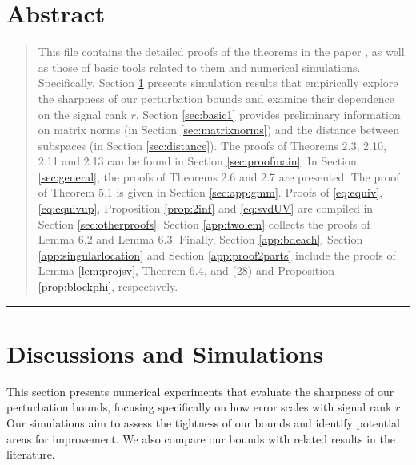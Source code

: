 \documentclass[reqno]{amsart}
\theoremstyle{plain}
\theoremstyle{definition}
\begin{document}
\section*{Abstract}
\begin{quotation}
\noindent This file contains the detailed proofs of the theorems in the paper \cite{Wang24}, as well as those of basic tools related to them and numerical simulations. Specifically, Section \ref{sec:simu} presents simulation results that empirically explore the sharpness of our perturbation bounds and examine their dependence on the signal rank \(r\). Section \ref{sec:basic1} provides preliminary information on matrix norms (in Section \ref{sec:matrixnorms}) and the distance between subspaces (in Section \ref{sec:distance}). The proofs of Theorems 2.3, 2.10, 2.11 and 2.13 can be found in Section \ref{sec:proofmain}. In Section \ref{sec:general}, the proofs of Theorems 2.6 and 2.7 are presented. The proof of Theorem 5.1 is given in Section \ref{sec:app:gmm}. Proofs of \eqref{eq:equiv}, \eqref{eq:equivup}, Proposition \ref{prop:2inf} and \eqref{eq:svdUV} are compiled in Section \ref{sec:otherproofs}. Section \ref{app:twolem} collects the proofs of Lemma 6.2 and Lemma 6.3. Finally, Section \ref{app:bdeach}, Section \ref{app:singularlocation} and Section \ref{app:proof2parts} include the proofs of Lemma \ref{lem:projsv}, Theorem 6.4, and (28) and Proposition \ref{prop:blockphi}, respectively. 
\end{quotation}

\vspace{1cm}
\hrule
\vspace{1cm}

\setcounter{section}{0}
\setcounter{equation}{0}
\renewcommand{\thesection}{S.\arabic{section}}
\renewcommand{\theequation}{S.\arabic{equation}}

\section{Discussions and Simulations}\label{sec:simu}
This section presents numerical experiments that evaluate the sharpness of our perturbation bounds, focusing specifically on how error scales with signal rank $r$. Our simulations aim to assess the tightness of our bounds and identify potential areas for improvement. We also compare our bounds with related results in the literature.
\end{document}
